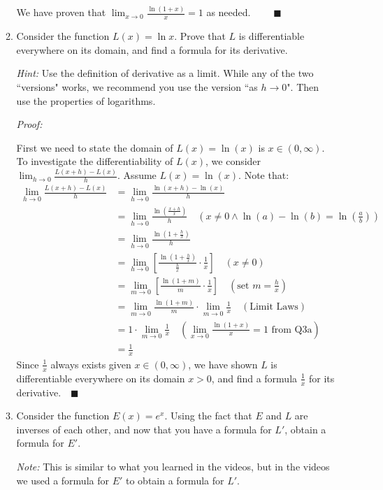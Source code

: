 \documentclass[12pt]{exam}
\newcommand {\DS} [1] {${\displaystyle #1}$}
\newcommand{\vv}{\vspace{.1cm}}
\begin{document}
\begin{enumerate}
\begin{enumerate}
        We have proven that \DS{\lim_{x \to 0} \frac{\ln (1+x)}{x} = 1} as needed. $\qquad \blacksquare$

\newpage

		\item  Consider the function $L(x) = \ln x$.  Prove that $L$ is differentiable everywhere on its domain, and find a formula for its derivative.
			
			\emph{Hint:}  Use the definition of derivative as a limit.  While any of the two ``versions" works, we recommend you use the version ``as $h \to 0$".  Then use the properties of logarithms.
		\vv
		
		\emph{Proof:}
		
		\vv
		
		First we need to state the domain of $L(x)=\ln(x)$ is $x\in(0,\infty).$
		To investigate the differentiability of $L(x)$, we consider \DS{\lim_{h \to 0} \frac{L(x+h)-L(x)}{h}.} Assume $L(x)=\ln(x).$ Note that:
		\begin{align*}
		    \lim_{h \to 0} \frac{L(x+h)-L(x)}{h}&=\lim_{h \to 0} \frac{\ln(x+h)-\ln(x)}{h}\\
		    &=\lim_{h \to 0} \frac{\ln(\frac{x+h}{x})}{h}\quad(x\neq0 \land \ln(a)-\ln(b)=\ln(\frac{a}{b}))\\
		    &=\lim_{h \to 0} \frac{\ln(1+\frac{h}{x})}{h}\\
		    &=\lim_{h \to 0}[ \frac{\ln(1+\frac{h}{x})}{\frac{h}{x}}\cdot\frac{1}{x}]\quad(x\neq0)\\
		    &=\lim_{m \to 0}[ \frac{\ln(1+m)}{m}\cdot\frac{1}{x}]\quad(\mbox{set } m=\frac{h}{x})\\
		    &=\lim_{m \to 0} \frac{\ln(1+m)}{m}\cdot\lim_{m \to 0}\frac{1}{x}\quad(\mbox{Limit Laws})\\
		    &=1\cdot\lim_{m \to 0}\frac{1}{x}\quad(\lim_{x \to 0} \frac{\ln (1+x)}{x} = 1 \mbox{ from Q3a})\\
		    &=\frac{1}{x}
		\end{align*}
		Since $\frac{1}{x}$ always exists given $x\in(0,\infty)$, we have shown $L$ is differentiable everywhere on its domain $x>0$, and find a formula $\frac{1}{x}$ for its derivative.$\quad\blacksquare$
		
\newpage

		\item  Consider the function \DS{E(x) = e^x}.  Using the fact that $E$ and $L$ are inverses of each other, and now that you have a formula for $L'$, obtain a formula for $E'$.
		
			\emph{Note:}  This is similar to what you learned in the videos, but in the videos we used a formula for $E'$ to obtain a formula for $L'$.
	    \vv
	    

\end{enumerate}
\end{enumerate}
\end{document}
